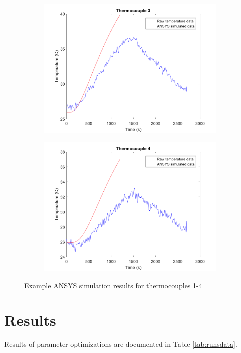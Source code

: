 \documentclass[letterpaper,titlepage,oneside]{report}
\begin{document}
\begin{figure}[ht]
\begin{subfigure}[h]{0.4\textwidth}
    \includegraphics[width=1\textwidth]{ansys3}
  \end{subfigure}
  \quad
  \begin{subfigure}[h]{0.4\textwidth}
    \includegraphics[width=1\textwidth]{ansys4}
  \end{subfigure}
  \caption{Example ANSYS simulation results for thermocouples 1-4}
  \label{fig:ansys}
\end{figure}

\chapter{Results}
\label{ch:results}
Results of parameter optimizations are documented in Table
\ref{tab:runsdata}.
\end{document}
